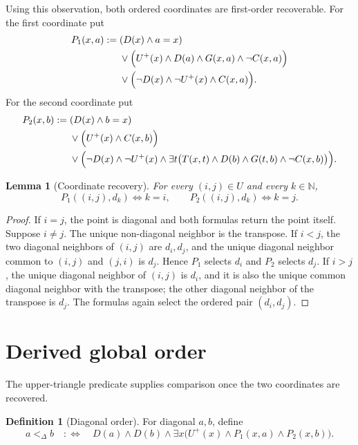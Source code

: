 \documentclass[11pt]{article}
\newtheorem{lemma}[theorem]{Lemma}
\theoremstyle{definition}
\newtheorem{definition}[theorem]{Definition}
\newcommand{\N}{\mathbb N}
\begin{document}
Using this observation, both ordered coordinates are first-order recoverable.  For the first coordinate put
\[
\begin{aligned}
P_1(x,a):={}&(D(x)\wedge a=x)\\
&\vee\Bigl(U^+(x)\wedge D(a)\wedge G(x,a)\wedge\neg C(x,a)\Bigr)\\
&\vee\Bigl(\neg D(x)\wedge\neg U^+(x)\wedge C(x,a)\Bigr).
\end{aligned}
\]
For the second coordinate put
\[
\begin{aligned}
P_2(x,b):={}&(D(x)\wedge b=x)\\
&\vee\Bigl(U^+(x)\wedge C(x,b)\Bigr)\\
&\vee\Bigl(\neg D(x)\wedge\neg U^+(x)\wedge
\exists t\bigl(T(x,t)\wedge D(b)\wedge G(t,b)\wedge\neg C(x,b)\bigr)\Bigr).
\end{aligned}
\]

\begin{lemma}[Coordinate recovery]\label{lem:coords}
For every $(i,j)\in U$ and every $k\in\N$,
\[
P_1((i,j),d_k)\Longleftrightarrow k=i,
\qquad
P_2((i,j),d_k)\Longleftrightarrow k=j.
\]
\end{lemma}

\begin{proof}
If $i=j$, the point is diagonal and both formulas return the point itself.  Suppose $i\ne j$.  The unique non-diagonal neighbor is the transpose.  If $i<j$, the two diagonal neighbors of $(i,j)$ are $d_i,d_j$, and the unique diagonal neighbor common to $(i,j)$ and $(j,i)$ is $d_j$.  Hence $P_1$ selects $d_i$ and $P_2$ selects $d_j$.  If $i>j$, the unique diagonal neighbor of $(i,j)$ is $d_i$, and it is also the unique common diagonal neighbor with the transpose; the other diagonal neighbor of the transpose is $d_j$.  The formulas again select the ordered pair $(d_i,d_j)$.
\end{proof}

\section{Derived global order}

The upper-triangle predicate supplies comparison once the two coordinates are recovered.

\begin{definition}[Diagonal order]
For diagonal $a,b$, define
\[
a<_{\Delta}b
\quad:\Longleftrightarrow\quad
D(a)\wedge D(b)\wedge
\exists x\bigl(U^+(x)\wedge P_1(x,a)\wedge P_2(x,b)\bigr).
\]
\end{definition}
\end{document}
